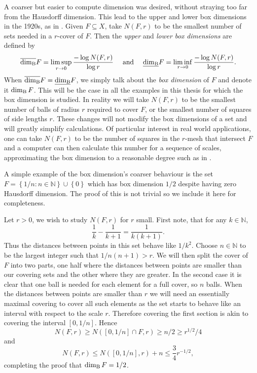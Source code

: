 A coarser but easier to compute dimension was desired, without straying too far from the Hausdorff dimension. This lead to the upper and lower box dimensions in the 1920s, as in \cite{bouligand}. Given $F\subseteq X$, take $N(F,r)$ to be the smallest number of sets needed in a $r$-cover of $F$. Then the \textit{upper} and \textit{lower box dimensions} are defined by
\[
\overline{\dim_{\textup{B}}} F = \limsup_{r \rightarrow 0} \frac{-\log N(F,r)}{\log r}   \quad \text{ and } \quad \underline{\dim_{\textup{B}}} F = \liminf_{r \rightarrow 0} \frac{-\log N(F,r)}{\log r}. 
\]
 When $\overline{\dim_{\textup{B}}} F = \underline{\dim_{\textup{B}}} F$, we simply talk about the \textit{box dimension} of $F$ and denote it $\dim_{\textup{B}} F$. This will be the case in all the examples in this thesis for which the box dimension is studied. In reality we will take $N(F,r)$ to be the smallest number of balls of radius $r$ required to cover $F$, or the smallest number of squares of side lengths $r$. These changes will not modify the box dimensions of a set and will greatly simplify calculations. Of particular interest in real world applications, one can take $N(F,r)$ to be the number of squares in the $r$-mesh that intersect $F$ and a computer can then calculate this number for a sequence of scales, approximating the box dimension to a reasonable degree such as in \cite{diieva}.

A simple example of the box dimension's coarser behaviour is the set $F = \left\{1/n \colon n \in \mathbb{N} \right\} \cup \left\{ 0\right\}$ which has box dimension $1/2$ despite having zero Hausdorff dimension. The proof of this is not trivial so we include it here for completeness. 

Let $r>0$, we wish to study $N(F,r)$ for $r$ small. First note, that for any $k \in \mathbb{N}$, 
\[
\frac{1}{k} - \frac{1}{k+1} = \frac{1}{k(k+1)}.
\]
Thus the distances between points in this set behave like $1/k^2$. Choose $n \in \mathbb{N}$ to be the largest integer such that $1/n(n+1) > r$. We will then split the cover of $F$ into two parts, one half where the distances between points are smaller than our covering sets and the other where they are greater. In the second case it is clear that one ball is needed for each element for a full cover, so $n$ balls. When the distances between points are smaller than $r$ we will need an essentially maximal covering to cover all such elements as the set starts to behave like an interval with respect to the scale $r$. Therefore covering the first section is akin to covering the interval $[0,1/n]$. Hence
\[
N(F,r) \ge N([0,1/n]\cap F,r) \ge n/2 \ge r^{1/2}/4
\]
and
\[
N(F,r) \le N([0,1/n],r) + n \le \frac{3}{4} r^{-1/2}, 
\]
completing the proof that $\dim_{\textup{B}} F = 1/2$.


